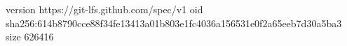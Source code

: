 version https://git-lfs.github.com/spec/v1
oid sha256:614b8790cce88f34fe13413a01b803e1fc4036a156531e0f2a65eeb7d30a5ba3
size 626416
